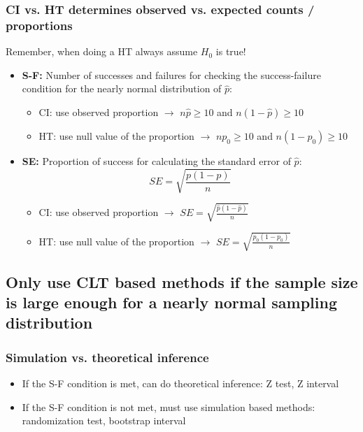 \documentclass[slidestop,compress,mathserif,12pt,t,professionalfonts,xcolor=table]{beamer}
\begin{document}
\begin{frame}
\frametitle{CI vs. HT determines observed vs. expected counts / proportions}

Remember, when doing a HT always assume $H_0$ is true!
\pause

\begin{itemize}

\item \textbf{S-F:} Number of successes and failures for checking the success-failure condition for the 
nearly normal distribution of $\hat{p}$:
\pause
\begin{itemize}
\item CI: use observed proportion $\rightarrow$ $n\hat{p} \ge 10$ and $n(1 - \hat{p}) \ge 10$
\pause
\item HT: use null value of the proportion $\rightarrow$ $np_0 \ge 10$ and $n(1 - p_0) \ge 10$
\end{itemize}

\pause

\item \textbf{SE:} Proportion of success for calculating the standard error of $\hat{p}$: 
\[ SE = \sqrt{\frac{p(1-p)}{n}} \]
\pause
\vspace{-0.5cm}
\begin{itemize}
\item CI: use observed proportion $\rightarrow$ $SE = \sqrt{\frac{\hat{p}(1-\hat{p})}{n}}$
\pause
\item HT: use null value of the proportion $\rightarrow$ $SE = \sqrt{\frac{p_0(1-p_0)}{n}}$
\end{itemize}

\end{itemize}

\end{frame}


\subsection{Only use CLT based methods if the sample size is large enough for a nearly normal sampling distribution}
\label{mi4}


\begin{frame}
\frametitle{Simulation vs. theoretical inference}

\begin{itemize}

\item If the S-F condition is met, can do theoretical inference: Z test, Z interval

\item If the S-F condition is not met, must use simulation based methods: randomization test, bootstrap interval

\end{itemize}

\end{frame}
\end{document}
